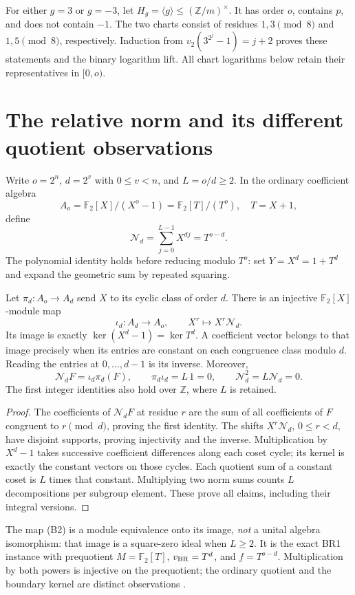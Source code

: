 For either $g=3$ or $g=-3$, let $H_g=\langle g\rangle\le(\mathbb Z/m)^\times$.
It has order $o$, contains $p$, and does not contain $-1$.
The two charts consist of residues $1,3\pmod8$ and $1,5\pmod8$, respectively.
Induction from $v_2(3^{2^j}-1)=j+2$ proves these statements and the binary
logarithm lift. All chart logarithms below retain their representatives in $[0,o)$.

\section{The relative norm and its different quotient observations}
Write $o=2^n$, $d=2^v$ with $0\le v<n$, and $L=o/d\ge2$.
In the ordinary coefficient algebra
\[
 A_o=\mathbb F_2[X]/(X^o-1)=\mathbb F_2[T]/(T^o),\quad T=X+1,
\]
define
\[
 \boxed{\mathcal N_d=\sum_{j=0}^{L-1}X^{dj}=T^{o-d}.}        \tag{B1}
\]
The polynomial identity holds before reducing modulo $T^o$: set
$Y=X^d=1+T^d$ and expand the geometric sum by repeated squaring.

\begin{theorem}
Let $\pi_d:A_o\to A_d$ send $X$ to its cyclic class of order $d$.
There is an injective $\mathbb F_2[X]$-module map
\[
 \iota_d:A_d\longrightarrow A_o,\qquad X^r\longmapsto X^r\mathcal N_d.
 \tag{B2}
\]
Its image is exactly $\ker(X^d-1)=\ker T^d$. A coefficient vector belongs to
that image precisely when its entries are constant on each congruence class
modulo $d$. Reading the entries at $0,\ldots,d-1$ is its inverse.
Moreover,
\[
 \boxed{\mathcal N_d F=\iota_d\pi_d(F),\qquad
 \pi_d\iota_d=L\,1=0,\qquad \mathcal N_d^2=L\mathcal N_d=0.} \tag{B3}
\]
The first integer identities also hold over $\mathbb Z$, where $L$ is retained.
\end{theorem}
\begin{proof}
The coefficients of $\mathcal N_d F$ at residue $r$ are the sum of all
coefficients of $F$ congruent to $r\pmod d$, proving the first identity.
The shifts $X^r\mathcal N_d$, $0\le r<d$, have disjoint supports, proving
injectivity and the inverse. Multiplication by $X^d-1$ takes successive
coefficient differences along each coset cycle; its kernel is exactly the
constant vectors on those cycles. Each quotient sum of a constant coset is
$L$ times that constant. Multiplying two norm sums counts $L$ decompositions
per subgroup element. These prove all claims, including their integral versions.
\end{proof}

The map (B2) is a module equivalence onto its image, \emph{not} a unital algebra
isomorphism: that image is a square-zero ideal when $L\ge2$. It is the exact
BR1 instance with prequotient $M=\mathbb F_2[T]$, $v_{\rm BR}=T^d$,
and $f=T^{o-d}$. Multiplication by both powers is injective on the prequotient;
the ordinary quotient and the boundary kernel are distinct observations
\cite[BR1--BR2, BR6--BR7]{SZ}.

